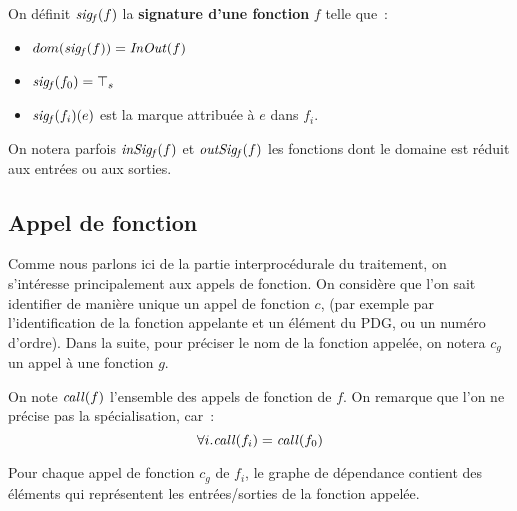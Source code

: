 % 


On définit $\mathit{sig_f}(f)$ la {\bf signature d'une fonction} $f$ telle que~:
\begin{itemize}
  \item $dom(\mathit{sig_f}(f)) = \mathit{InOut}(f)$
  \item $\mathit{sig_f}(f_0) = {\top}_s$
  \item $\mathit{sig_f}(f_i)(e)$ est la marque attribuée à $e$ dans $f_i$.
\end{itemize}
\bb

On notera parfois $\mathit{inSig_f}(f)$ et $\mathit{outSig_f}(f)$ les fonctions dont le domaine
est réduit aux entrées ou aux sorties.


\subsection{Appel de fonction}

Comme nous parlons ici de la partie interprocédurale du traitement, on
s'intéresse principalement aux appels de fonction.  On considère que l'on sait
identifier de manière unique un appel de fonction $c$, (par exemple par
l'identification de la fonction appelante et un élément du PDG, ou un numéro
d'ordre). Dans la suite, pour préciser le nom de la fonction appelée,
on notera $c_g$ un appel à une fonction $g$.\bb

On note $\mathit{call}(f)$ l'ensemble des appels de fonction de $f$.
On remarque que l'on ne précise pas la spécialisation, car~:
\begin{equation*}
\forall i. \mathit{call}(f_i) = \mathit{call}(f_0)
\end{equation*}
\bb

Pour chaque appel de fonction $c_g$ de $f_i$, 
le graphe de dépendance contient des éléments qui
représentent les entrées/sorties de la fonction appelée.


